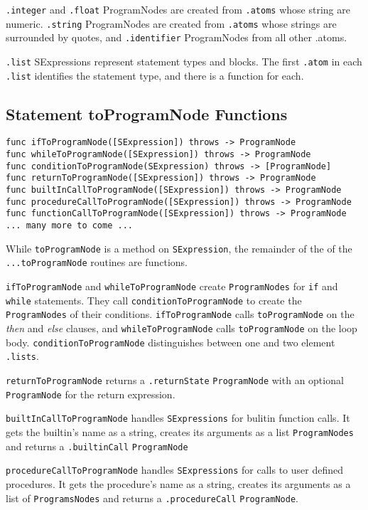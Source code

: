 \texttt{.integer} and \texttt{.float} ProgramNodes are created from \texttt{.atoms} whose string are numeric.
\texttt{.string} ProgramNodes are created from \texttt{.atoms} whose strings are surrounded by
quotes, and \texttt{.identifier} ProgramNodes from all other .atoms.

\texttt{.list} SExpressions represent statement types and blocks. The
first \texttt{.atom} in each \texttt{.list} identifies the statement type, and there is a
function for each.

\subsection{Statement toProgramNode Functions}
\begin{verbatim}
func ifToProgramNode([SExpression]) throws -> ProgramNode
func whileToProgramNode([SExpression]) throws -> ProgramNode
func conditionToProgramNode(SExpression) throws -> [ProgramNode]
func returnToProgramNode([SExpression]) throws -> ProgramNode
func builtInCallToProgramNode([SExpression]) throws -> ProgramNode
func procedureCallToProgramNode([SExpression]) throws -> ProgramNode
func functionCallToProgramNode([SExpression]) throws -> ProgramNode
... many more to come ...
\end{verbatim}

While \texttt{toProgramNode} is a method on \texttt{SExpression}, the remainder of the
of the \texttt{...toProgramNode} routines are functions.

\texttt{ifToProgramNode} and \texttt{whileToProgramNode} create
\texttt{ProgramNodes} for \texttt{if} and \texttt{while} statements.
They call \texttt{conditionToProgramNode} to create the
\texttt{ProgramNodes} of their conditions.
\texttt{ifToProgramNode} calls \texttt{toProgramNode} on the \emph{then}
and \emph{else} clauses, and
\texttt{whileToProgramNode} calls \texttt{toProgramNode} on the loop body.
\texttt{conditionToProgramNode} distinguishes between one and two
element \texttt{.lists}.

\texttt{returnToProgramNode} returns a \texttt{.returnState}
\texttt{ProgramNode} with an optional
\texttt{ProgramNode} for the return expression.

\texttt{builtInCallToProgramNode} handles \texttt{SExpressions} for
bulitin function calls. It gets the builtin's name as a string,
creates its arguments as a list \texttt{ProgramNodes} and returns
a \texttt{.builtinCall} \texttt{ProgramNode}

\texttt{procedureCallToProgramNode} handles \texttt{SExpressions} for
calls to user defined procedures. It gets the procedure's name as a string,
creates its arguments as a list of \texttt{ProgramsNodes} and returns
a \texttt{.procedureCall} \texttt{ProgramNode}.


